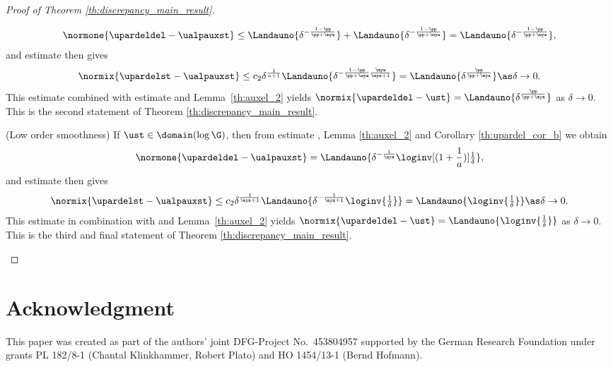 \documentclass[10pt]{article}
\theoremstyle{definition}
\begin{document}
\begin{proof}[Proof of Theorem \ref{th:discrepancy_main_result}]
\begin{myenumerate}
\begin{align*}
\normone{\upardeldel - \ualpauxst}
\le  \Landauno{\delta^{-\frac{1-\pp}{\pp+\mya}}} +
\Landauno{\delta^{-\frac{1-\pp}{\pp+\mya}}}
=
\Landauno{\delta^{-\frac{1-\pp}{\pp+\mya}}},
\end{align*}
and estimate 
then gives
%
\begin{align*}
\normix{\upardelst -\ualpauxst}
 \le
c_2 \delta^{\frac{1}{a+1}} \Landauno{\delta^{-\frac{1-\pp}{\pp+\mya}\frac{\mya}{\mya+1}}}
= \Landauno{\delta^{\frac{\pp}{\pp+\mya}}}
\as \delta \to 0.
\end{align*}
%
This estimate combined with estimate 
and Lemma~\ref{th:auxel_2}
yields
$
\normix{\upardeldel -\ust}
= \Landauno{\delta^{\frac{\pp}{\pp+\mya}}}
$ as $ \delta \to 0 $. This is the second statement of
Theorem \ref{th:discrepancy_main_result}.

\item (Low order smoothness)
If $ \ust \in \domain(\log \G) $, then
from
estimate , Lemma \ref{th:auxel_2} and Corollary \ref{th:upardel_cor_b}
we obtain
%
\begin{align*}
\normone{\upardeldel - \ualpauxst}
= \Landauno{\delta^{-\frac{1}{\mya}} \loginv[(1+\frac{1}{a})]{\tfrac{1}{\delta}}},
\end{align*}
and estimate 
then gives
%
\begin{align*}
\normix{\upardelst -\ualpauxst}
 \le
c_2 \delta^{\frac{1}{\mya+1}}
\Landauno{\delta^{-\frac{1}{\mya+1}} \loginv{\tfrac{1}{\delta}}}
=
\Landauno{\loginv{\tfrac{1}{\delta}}} \as \delta \to 0.
\end{align*}
%
This estimate in combination with  
and Lemma~\ref{th:auxel_2}
yields
$
\normix{\upardeldel -\ust}
= \Landauno{\loginv{\tfrac{1}{\delta}}} $ as $ \delta \to 0 $. This is the third and final statement of
Theorem \ref{th:discrepancy_main_result}.
\end{myenumerate}
%
\end{proof}


\section*{Acknowledgment}
This paper was created as part of the authors' joint DFG-Project No.~453804957 supported by the German Research Foundation under grants PL 182/8-1 (Chantal Klinkhammer, Robert Plato) and  HO 1454/13-1 (Bernd Hofmann).
%

\end{document}
